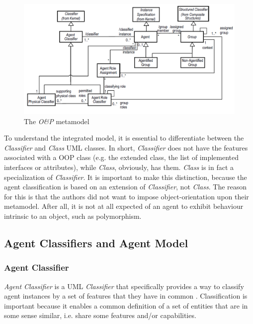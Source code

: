 \begin{figure}[ht]
	\centering
	\includegraphics[width=\textwidth]{images/onp/onp-metamodel.png}
	\caption{The \textit{O\&P} metamodel \cite{Odell05}}
	\label{figure:onp-metamodel}
\end{figure}

To understand the integrated model, it is essential to differentiate between the \textit{Classifier} and \textit{Class} UML classes.
In short, \textit{Classifier} does not have the features associated with a OOP class (e.g. the extended class, the list of implemented interfaces or attributes), while \textit{Class}, obviously, has them.
\textit{Class} is in fact a specialization of \textit{Classifier}.
It is important to make this distinction, because the agent classification is based on an extension of \textit{Classifier}, not \textit{Class}.
The reason for this is that the authors did not want to impose object-orientation upon their metamodel.
After all, it is not at all expected of an agent to exhibit behaviour intrinsic to an object, such as polymorphism.

\subsection{Agent Classifiers and Agent Model}

\subsubsection*{Agent Classifier}

\textit{Agent Classifier} is a UML \textit{Classifier} that specifically provides a way to classify agent instances by a set of features that they have in common \cite{Odell05}.
Classification is important because it enables a common definition of a set of entities that are in some sense similar, i.e. share some features and/or capabilities.

